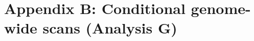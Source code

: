 \documentclass[9pt,twocolumn,twoside]{gsajnl}
\newcommand{\GKinline}[1]{\textcolor{teal}{#1}}
\begin{document}


\section{Appendix B: Conditional genome-wide scans (Analysis G)}
\end{document}

